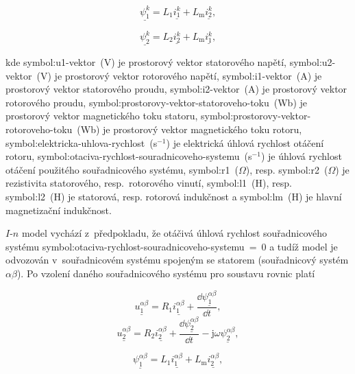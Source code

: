 \documentclass[a4paper, twoside, 11pt]{article}
\begin{document}
		\begin{equation}
			\underline{\psi_1^{k}} = L_1 \underline{i_1^{k}} + L_\text{m} \underline{i_2^{k}},
		\end{equation}
	
		\begin{equation}
			\underline{\psi_2^{k}} = L_2 \underline{i_2^{k}} + L_\text{m} \underline{i_1^{k}},
		\end{equation}

		kde \gls{symbol:u1-vektor}~(V) je prostorový vektor statorového napětí, \gls{symbol:u2-vektor}~(V) je prostorový vektor rotorového napětí, \gls{symbol:i1-vektor}~(A) je prostorový vektor statorového proudu, \gls{symbol:i2-vektor}~(A) je prostorový vektor rotorového proudu, \gls{symbol:prostorovy-vektor-statoroveho-toku}~(Wb) je prostorový vektor magnetického toku statoru, \gls{symbol:prostorovy-vektor-rotoroveho-toku}~(Wb) je prostorový vektor magnetického toku rotoru, \gls{symbol:elektricka-uhlova-rychlost}~(s$^{-1}$) je elektrická úhlová rychlost otáčení rotoru, \gls{symbol:otaciva-rychlost-souradnicoveho-systemu}~(s$^{-1}$) je úhlová rychlost otáčení použitého souřadnicového systému, \gls{symbol:r1}~($\Omega$), resp. \gls{symbol:r2}~($\Omega$) je rezistivita statorového, resp.~rotorového vinutí, \gls{symbol:l1}~(H), resp. \gls{symbol:l2}~(H) je statorová, resp. rotorová indukčnost a \gls{symbol:lm}~(H) je hlavní magnetizační indukčnost.\par
		$I$-$n$ model vychází z~předpokladu, že otáčivá úhlová rychlost souřadnicového systému \gls{symbol:otaciva-rychlost-souradnicoveho-systemu}~=~0 a tudíž model je odvozován v~souřadnicovém systému spojeným se statorem (souřadnicový systém $\alpha \beta$). Po vzolení daného souřadnicového systému pro soustavu rovnic platí

		\begin{equation}
			\underline{u_{1}^{\alpha \beta}} = R_1 \underline{i_{1}^{\alpha \beta}} + \frac{\dd{\underline{\psi_1^{\alpha \beta}}}}{\dd{t}},
		\end{equation}
		\begin{equation}\label{eq:alphabeta-napeti-rotor-rovnice-i-n-model}
			\underline{u_{2}^{\alpha \beta}} = R_2 \underline{i_{2}^{\alpha \beta}} + \frac{\dd{\underline{\psi_2^{\alpha \beta}}}}{\dd{t}} - \text{j} \omega \underline{\psi_2^{\alpha \beta}},
		\end{equation}
	
		\begin{equation}
			\underline{\psi_1^{\alpha \beta}} = L_1 \underline{i_1^{\alpha \beta}} + L_\text{m} \underline{i_2^{\alpha \beta}},
		\end{equation}
	
\end{document}
